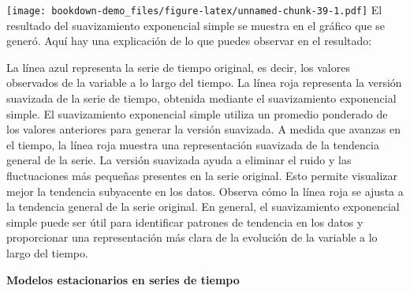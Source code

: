 \documentclass[
]{book}
\newenvironment{Shaded}{\begin{snugshade}}{\end{snugshade}}
\newcommand{\AttributeTok}[1]{\textcolor[rgb]{0.77,0.63,0.00}{#1}}
\newcommand{\CommentTok}[1]{\textcolor[rgb]{0.56,0.35,0.01}{\textit{#1}}}
\newcommand{\DecValTok}[1]{\textcolor[rgb]{0.00,0.00,0.81}{#1}}
\newcommand{\FunctionTok}[1]{\textcolor[rgb]{0.00,0.00,0.00}{#1}}
\newcommand{\NormalTok}[1]{#1}
\newcommand{\OtherTok}[1]{\textcolor[rgb]{0.56,0.35,0.01}{#1}}
\newcommand{\SpecialCharTok}[1]{\textcolor[rgb]{0.00,0.00,0.00}{#1}}
\newcommand{\StringTok}[1]{\textcolor[rgb]{0.31,0.60,0.02}{#1}}
\begin{document}
\begin{Shaded}
\end{Shaded}

\texttt{[image: bookdown-demo\_files/figure-latex/unnamed-chunk-39-1.pdf]}
El resultado del suavizamiento exponencial simple se muestra en el gráfico que se generó. Aquí hay una explicación de lo que puedes observar en el resultado:

La línea azul representa la serie de tiempo original, es decir, los valores observados de la variable a lo largo del tiempo.
La línea roja representa la versión suavizada de la serie de tiempo, obtenida mediante el suavizamiento exponencial simple.
El suavizamiento exponencial simple utiliza un promedio ponderado de los valores anteriores para generar la versión suavizada. A medida que avanzas en el tiempo, la línea roja muestra una representación suavizada de la tendencia general de la serie.
La versión suavizada ayuda a eliminar el ruido y las fluctuaciones más pequeñas presentes en la serie original. Esto permite visualizar mejor la tendencia subyacente en los datos.
Observa cómo la línea roja se ajusta a la tendencia general de la serie original. En general, el suavizamiento exponencial simple puede ser útil para identificar patrones de tendencia en los datos y proporcionar una representación más clara de la evolución de la variable a lo largo del tiempo.

\textbf{Modelos estacionarios en series de tiempo}
\end{document}
